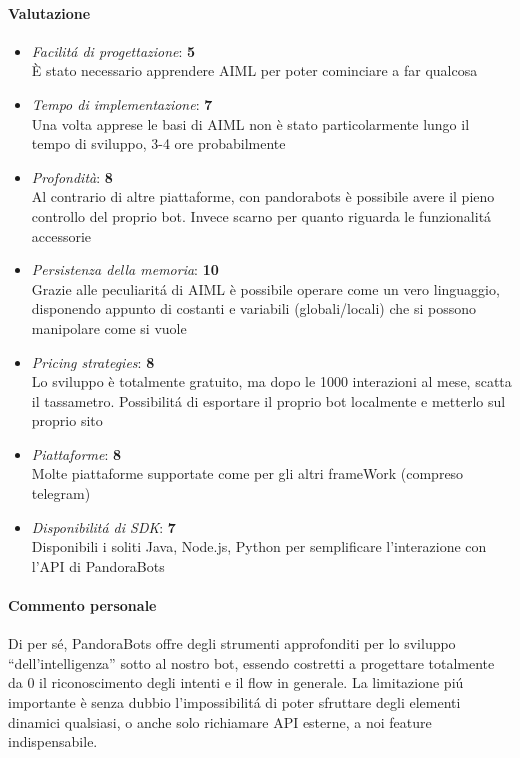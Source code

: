 \documentclass[]{article}
\begin{document}
\paragraph{Valutazione}
\begin{itemize}
\item \textit{Facilitá di progettazione}: \textbf{5} \\ È stato necessario apprendere AIML per poter cominciare a far qualcosa
\item \textit{Tempo di implementazione}: \textbf{7} \\ Una volta apprese le basi di AIML non è stato particolarmente lungo il tempo di sviluppo, 3-4 ore probabilmente
\item \textit{Profondità}: \textbf{8} \\ Al contrario di altre piattaforme, con pandorabots è possibile avere il pieno controllo del proprio bot. Invece scarno per quanto riguarda le funzionalitá accessorie
\item \textit{Persistenza della memoria}: \textbf{10} \\ Grazie alle peculiaritá di AIML è possibile operare come un vero linguaggio, disponendo appunto di costanti e variabili (globali/locali) che si possono manipolare come si vuole
\item \textit{Pricing strategies}: \textbf{8} \\ Lo sviluppo è totalmente gratuito, ma dopo le 1000 interazioni al mese, scatta il tassametro. Possibilitá di esportare il proprio bot localmente e metterlo sul proprio sito
\item \textit{Piattaforme}: \textbf{8} \\ Molte piattaforme supportate come per gli altri frameWork (compreso telegram)
\item \textit{Disponibilitá di SDK}: \textbf{7} \\ Disponibili i soliti Java, Node.js, Python per semplificare l’interazione con l’API di PandoraBots
\end{itemize}
\paragraph{Commento personale}
Di per sé, PandoraBots offre degli strumenti approfonditi per lo sviluppo “dell'intelligenza” sotto al nostro bot, essendo costretti a progettare totalmente da 0 il riconoscimento degli intenti e il flow in generale. La limitazione piú importante è senza dubbio l’impossibilitá di poter sfruttare degli elementi dinamici qualsiasi, o anche solo richiamare API esterne, a noi feature indispensabile. 
\end{document}

